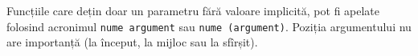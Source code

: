 \begin{sourcecode}
	\label{defaultparametrs}
	\inputminted[linenos]{icl}{../sources/defaultparametrs.icL}
\end{sourcecode}

Funcțiile care dețin doar un parametru fără valoare implicită, pot fi apelate folosind acronimul \texttt{nume argument} sau \texttt{nume (argument)}. Poziția argumentului nu are importanță (la început, la mijloc sau la sfîrșit).
